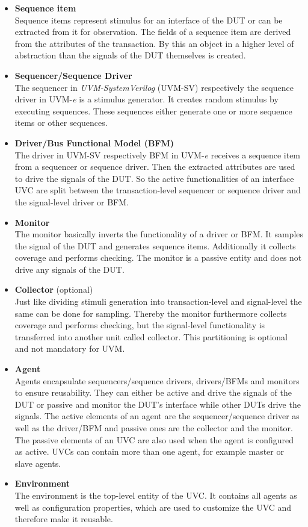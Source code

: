 \begin{itemize}
  \item \textbf{Sequence item}\\
  Sequence items represent stimulus for an interface of the
  DUT or can be extracted from it for observation.
  The fields of a sequence item are derived from the attributes of the transaction.
  By this an object in a higher level of abstraction than the signals of the
  DUT themselves is created.
  \item \textbf{Sequencer/Sequence Driver}\\
  The sequencer in \emph{UVM-SystemVerilog} (UVM-SV) respectively the sequence
  driver in UVM-\textit{e} \cite{uvm_e} is a stimulus generator. It creates random
  stimulus by executing sequences. These sequences either generate one or more
  sequence items or other sequences.
  \item \textbf{Driver/Bus Functional Model (BFM)}\\
  The driver in UVM-SV respectively BFM in UVM-\textit{e} \cite{uvm_e} receives a sequence
  item from a sequencer or sequence driver. Then the extracted attributes are
  used to drive the signals of the DUT. So the active functionalities of an
  interface UVC are split between the transaction-level sequencer or sequence
  driver and the signal-level driver or BFM.
  \item \textbf{Monitor}\\
  The monitor basically inverts the functionality of a driver or BFM. It samples
  the signal of the DUT and generates sequence items. Additionally it collects coverage
  and performs checking. The monitor is a passive entity and does not drive any
  signals of the DUT.
  \item \textbf{Collector} (optional)\\
  Just like dividing stimuli generation into transaction-level and signal-level
  the same can be done for sampling. Thereby the monitor furthermore collects
  coverage and performs checking, but the signal-level functionality is
  transferred into another unit called collector. This partitioning is optional
  and not mandatory for UVM.
  \item \textbf{Agent}\\
  Agents encapsulate sequencers/sequence drivers, drivers/BFMs and monitors to
  ensure reusability. They can either be active and drive the signals of the DUT
  or passive and monitor the DUT's interface while other DUTs drive the
  signals. The active elements of an agent are the sequencer/sequence driver as
  well as the driver/BFM and passive ones are the collector and the monitor. The
  passive elements of an UVC are also used when the agent is configured as
  active. UVCs can contain more than one agent, for example master or slave
  agents.
  \item \textbf{Environment}\\
  The environment is the top-level entity of the UVC. It contains all agents as
  well as configuration properties, which are used to customize the UVC and
  therefore make it reusable.
\end{itemize}

